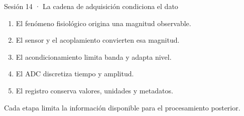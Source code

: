 \documentclass[
  ignorenonframetext,
  aspectratio=169,
  spanish,
]{beamer}
\providecommand{\faExclamation}{\faIcon{exclamation}}
\providecommand{\tightlist}{%
  \setlength{\itemsep}{0pt}\setlength{\parskip}{0pt}}
\begin{document}
\begin{frame}{Sesión 14 · La cadena de adquisición condiciona el dato}
  \protect{}\label{sesiuxf3n-14-la-cadena-de-adquisiciuxf3n-condiciona-el-dato}
  \begin{enumerate}
    \tightlist
    \item
          El fenómeno fisiológico origina una magnitud observable.
    \item
          El sensor y el acoplamiento convierten esa magnitud.
    \item
          El acondicionamiento limita banda y adapta nivel.
    \item
          El ADC discretiza tiempo y amplitud.
    \item
          El registro conserva valores, unidades y metadatos.
  \end{enumerate}

  \begin{tcolorbox}[enhanced jigsaw, arc=.35mm, bottomrule=.15mm, bottomtitle=1mm, breakable, colback=white, colbacktitle=quarto-callout-important-color!10!white, colframe=quarto-callout-important-color-frame, coltitle=black, left=2mm, leftrule=.75mm, opacityback=0, opacitybacktitle=0.6, rightrule=.15mm, title=\textcolor{quarto-callout-important-color}{\faExclamation}\hspace{0.5em}{Importante}, titlerule=0mm, toprule=.15mm, toptitle=1mm]

    Cada etapa limita la información disponible para el procesamiento
    posterior.

  \end{tcolorbox}
\end{frame}
\end{document}
